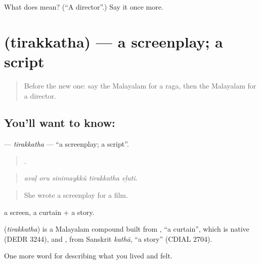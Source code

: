 \begin{tcolorbox}[breakable,colback=teal!4,colframe=teal!35!black,title={Before you move on}]
What does  mean? (\textquotedblleft{}A director\textquotedblright{}.) Say it once more.
\end{tcolorbox}
\section[\texorpdfstring{\ml{തിരക്കഥ} (tirakkatha)}{തിരക്കഥ (tirakkatha)}]{ (tirakkatha) — a screenplay; a script}

\label{lesson:ML-C562-tirakkatha}



\begin{quote}
Before the new one: say the Malayalam for a raga, then the Malayalam for a director.
\end{quote}

\subsection*{You'll want to know: }
\textbf{} — \emph{tirakkatha} — \textquotedblleft{}a screenplay; a script\textquotedblright{}.

\begin{quote}
    .
\end{quote}

\begin{quote}
\emph{avaḷ oru sinimaykkŭ tirakkatha eḻuti.}
\end{quote}

\begin{quote}
She wrote a screenplay for a film.
\end{quote}

 a screen, a curtain +  a story.

\begin{cousinweb}
\textbf{} (\emph{tirakkatha}) is a Malayalam compound built from , \textquotedblleft{}a curtain\textquotedblright{}, which is native (DEDR 3244), and , from Sanskrit \emph{kathā}, \textquotedblleft{}a story\textquotedblright{} (CDIAL 2704).
\end{cousinweb}

\begin{grammarlens}[title={What you've built}]
One more word for describing what you lived and felt.
\end{grammarlens}

